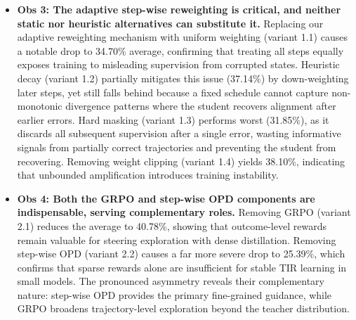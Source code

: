 \begin{itemize}[leftmargin=*]

\item \textbf{Obs 3: The adaptive step-wise reweighting is critical, and neither static nor heuristic alternatives can substitute it.}
Replacing our adaptive reweighting mechanism with uniform weighting (variant 1.1) causes a notable drop to 34.70\% average, confirming that treating all steps equally exposes training to misleading supervision from corrupted states. Heuristic decay (variant 1.2) partially mitigates this issue (37.14\%) by down-weighting later steps, yet still falls behind because a fixed schedule cannot capture non-monotonic divergence patterns where the student recovers alignment after earlier errors. Hard masking (variant 1.3) performs worst (31.85\%), as it discards all subsequent supervision after a single error, wasting informative signals from partially correct trajectories and preventing the student from recovering. Removing weight clipping (variant 1.4) yields 38.10\%, indicating that unbounded amplification introduces training instability. 

\item \textbf{Obs 4: Both the GRPO and step-wise OPD components are indispensable, serving complementary roles.}
Removing GRPO (variant 2.1) reduces the average to 40.78\%, showing that outcome-level rewards remain valuable for steering exploration with dense distillation. Removing step-wise OPD (variant 2.2) causes a far more severe drop to 25.39\%, 
which confirms that sparse rewards alone are insufficient for stable TIR learning in small models. The pronounced asymmetry reveals their complementary nature: step-wise OPD provides the primary fine-grained guidance, while GRPO broadens trajectory-level exploration beyond the teacher distribution.


\end{itemize}



